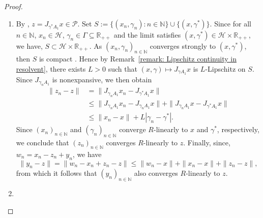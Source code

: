 \documentclass[a4paper,12pt]{article}
\begin{document}
\begin{proof}
\begin{enumerate}[(\ref{cor:fixed-point-convergence})]
    \item[(\ref{cor:primal-convergence})] By \cite[Corollary~4.11]{atenas2025relocated}, $z=J_{\gamma^* A_{1}}x\in\mathcal{P}$.
    Set $S:=\{(x_n,\gamma_n):n\in\mathbb{N}\}\cup\{(x,\gamma^*)\}$. Since for all $n\in \mathbb{N}$, $x_n\in\mathcal{H}$, $\gamma_n\in\Gamma\subseteq\mathbb{R}_{++}$  and the limit satisfies $(x,\gamma^*)\in\mathcal{H}\times\mathbb{R}_{++}$, we have, $S\subset\mathcal{H}\times\mathbb{R}_{++}$. As $(x_n,\gamma_n)_{n\in\mathbb{N}}$ converges strongly to $(x,\gamma^*)$, then $S$ is compact \cite[Theorem 2.38]{aliprantis2006infinite}.
Hence by Remark~\ref{remark: Lipschitz continuity in resolvent}, there exists $L>0$ such that $(x,\gamma)\mapsto J_{\gamma A_1}x$ is $L$-Lipschitz on $S$. Since $J_{\gamma_n A_{1}}$ is nonexpansive, we then obtain
    \begin{equation}\label{eq-NDR:7}
    \begin{aligned}
        \|z_n-z\|&=\|J_{\gamma_nA_1}x_n-J_{\gamma^*A_1}x\|\\
        &\leq\|J_{\gamma_nA_1}x_n-J_{\gamma_nA_1}x\|+\|J_{\gamma_nA_1}x-J_{\gamma^*A_1}x\|\\
        &\leq\|x_n-x\|+L|\gamma_n-\gamma^*|.
        \end{aligned}
    \end{equation}
 Since  $(x_n)_{n\in\mathbb{N}}$ and $(\gamma_n)_{n\in\mathbb{N}}$ converge $R$-linearly to $x$ and $\gamma^*$, respectively, we conclude that $(z_n)_{n\in\mathbb{N}}$ converges $R$-linearly to $z$. Finally, since, $w_n=x_n-z_n+y_n$, we have
$$\|y_n-z\|=\|w_n-x_n+z_n-z\|\leq\|w_n-x\|+\|x_n-x\|+\|z_n-z\|,$$
from which it follows that $(y_n)_{n\in\mathbb{N}}$ also converges $R$-linearly to $z$.

\item[(\ref{cor:dual-convergence})] 


\end{enumerate}
\end{proof}
\end{document}
